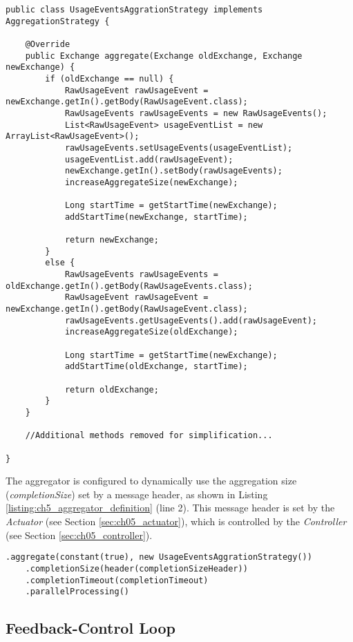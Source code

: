 \begin{lstlisting}[caption={UsageEventsAggrationStrategy},label=listing:ch5_UsageEventsAggrationStrategy]
public class UsageEventsAggrationStrategy implements AggregationStrategy {

	@Override
	public Exchange aggregate(Exchange oldExchange, Exchange newExchange) {
		if (oldExchange == null) {
			RawUsageEvent rawUsageEvent = newExchange.getIn().getBody(RawUsageEvent.class);
			RawUsageEvents rawUsageEvents = new RawUsageEvents();
			List<RawUsageEvent> usageEventList = new ArrayList<RawUsageEvent>();
			rawUsageEvents.setUsageEvents(usageEventList);
			usageEventList.add(rawUsageEvent);
			newExchange.getIn().setBody(rawUsageEvents);
			increaseAggregateSize(newExchange);
			
			Long startTime = getStartTime(newExchange);
			addStartTime(newExchange, startTime);
			
			return newExchange;
		}
		else {
			RawUsageEvents rawUsageEvents = oldExchange.getIn().getBody(RawUsageEvents.class);
			RawUsageEvent rawUsageEvent = newExchange.getIn().getBody(RawUsageEvent.class);
			rawUsageEvents.getUsageEvents().add(rawUsageEvent);
			increaseAggregateSize(oldExchange);
			
			Long startTime = getStartTime(newExchange);
			addStartTime(oldExchange, startTime);
			
			return oldExchange;
		}
	}
	
	//Additional methods removed for simplification...
	
}
\end{lstlisting}

The aggregator is configured to dynamically use the aggregation size (\emph{completionSize}) set by a message header, as shown in Listing \ref{listing:ch5_aggregator_definition} (line 2). This message header is set by the \emph{Actuator} (see Section \ref{sec:ch05_actuator}), which is controlled by the \emph{Controller} (see Section \ref{sec:ch05_controller}).

\begin{lstlisting}[caption={Aggregator configuration in definition of BillingRoute},label=listing:ch5_aggregator_definition]
.aggregate(constant(true), new UsageEventsAggrationStrategy())
	.completionSize(header(completionSizeHeader))
	.completionTimeout(completionTimeout)
	.parallelProcessing()
\end{lstlisting}

\subsection{Feedback-Control Loop}

